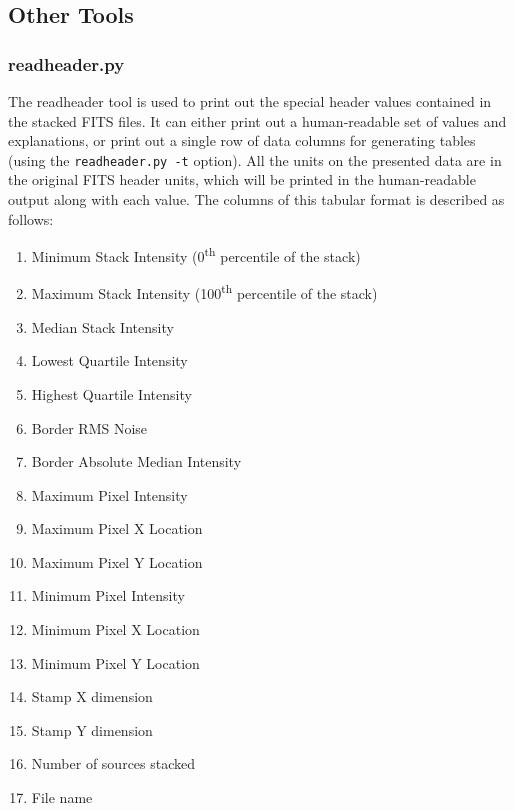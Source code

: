 \documentclass{article}
\begin{document}
\subsection{Other Tools}
\subsubsection{readheader.py}
The readheader tool is used to print out the special header values contained in 
the stacked FITS files.  It can either print out a human-readable set of values
and explanations, or print out a single row of data columns for generating 
tables (using the \verb!readheader.py -t! option). All the units on the 
presented data are in the original FITS header units, which will be printed
in the human-readable output along with each value. The columns of this tabular
format is described as follows:

\begin{enumerate}
	\item Minimum Stack Intensity (0\textsuperscript{th} percentile of the 
	stack)
	\item Maximum Stack Intensity (100\textsuperscript{th} percentile of the 
	stack)
	\item Median Stack Intensity
	\item Lowest Quartile Intensity
	\item Highest Quartile Intensity
	\item Border RMS Noise
	\item Border Absolute Median Intensity
	\item Maximum Pixel Intensity
	\item Maximum Pixel X Location
	\item Maximum Pixel Y Location
	\item Minimum Pixel Intensity
	\item Minimum Pixel X Location
	\item Minimum Pixel Y Location
	\item Stamp X dimension
	\item Stamp Y dimension
	\item Number of sources stacked
	\item File name
\end{enumerate}
\end{document}
